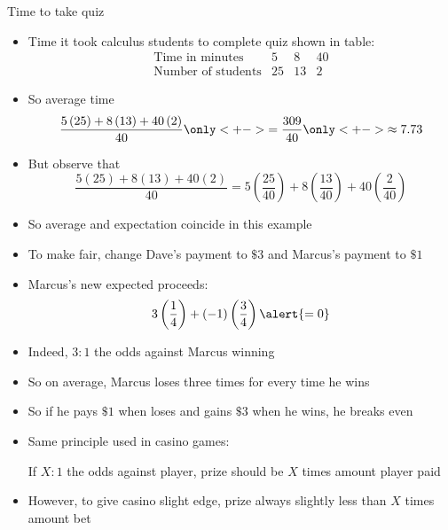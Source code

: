 
\begin{frame}{Time to take quiz}
\begin{itemize}
\item Time it took calculus students to complete quiz
shown in table:
\[\begin{array}{r|ccc}
\text{Time in minutes}&5&8&40\\\hline
\text{Number of students}&25&13&2
\end{array}\]
\item So average time
\[\frac{5\left(25\right)+8\left(13\right)+40\left(2\right)}{40}
\only<+->{=\frac{309}{40}}
\only<+->{\approx 7.73}\]
\item But observe that
\[\frac{5\left(25\right)+8\left(13\right)+40\left(2\right)}{40}
=5\left(\frac{25}{40}\right)+8\left(\frac{13}{40}\right)
+40\left(\frac{2}{40}\right)\]
\item So average and expectation coincide in this example
\end{itemize}
\end{frame}

\begin{frame}
\begin{itemize}
\item To make \alert{fair}, change Dave's payment to
\alert{$\$3$}
and Marcus's payment to \alert{$\$1$}
\item Marcus's new expected proceeds:
\[3\left(\frac{1}{4}\right)
+\left(-1\right)\left(\frac{3}{4}\right)\alert{=0}\]
\item Indeed, $3:1$ the odds against Marcus winning
\item So on average, Marcus loses three times for every
time he wins
\item So if he pays $\$1$ when loses
and gains $\$3$ when he wins, he breaks even
\item Same principle used in casino games:
\begin{principle}
If $X:1$ the
odds against player, prize \alert{should} be $X$ times
amount player paid
\end{principle}
\item However, to give casino slight edge, prize always
slightly less than $X$ times amount bet
\end{itemize}
\end{frame}

